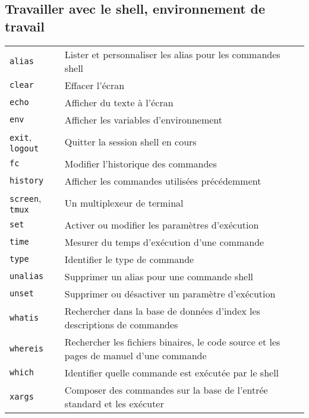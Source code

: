 \documentclass[10pt,a4paper]{article}
\begin{document}
\begin{multicols}{2}
\section{Travailler avec le shell, environnement de travail}
\begin{tabular}{ p{2.5cm} p{8.5cm} }
  \hline
  \texttt{alias} & Lister et personnaliser les alias pour les commandes shell \\
  \rowcolor{Gray}
  \texttt{clear} & Effacer l'écran \\
  \texttt{echo} & Afficher du texte à l'écran \\
  \rowcolor{Gray}
  \texttt{env} & Afficher les variables d'environnement \\
  \texttt{exit}, \texttt{logout} & Quitter la session shell en cours \\
  \rowcolor{Gray}
  \texttt{fc} & Modifier l'historique des commandes \\
  \texttt{history} & Afficher les commandes utilisées précédemment \\
  \rowcolor{Gray}
  \texttt{screen}, \texttt{tmux} & Un multiplexeur de terminal \\
  \texttt{set} & Activer ou modifier les paramètres d'exécution \\
  \rowcolor{Gray}
  \texttt{time} & Mesurer du temps d'exécution d'une commande \\
  \texttt{type} & Identifier le type de commande \\
  \rowcolor{Gray}
  \texttt{unalias} & Supprimer un alias pour une commande shell \\
  \texttt{unset} & Supprimer ou désactiver un paramètre d'exécution \\
  \rowcolor{Gray}
  \texttt{whatis} & Rechercher dans la base de données d'index les descriptions de commandes \\
  \texttt{whereis} & Rechercher les fichiers binaires, le code source et les pages de manuel d'une commande \\
  \rowcolor{Gray}
  \texttt{which} & Identifier quelle commande est exécutée par le shell\\
  \texttt{xargs} & Composer des commandes sur la base de l'entrée standard et les exécuter\\
  \hline
\end{tabular}



\end{multicols}
\end{document}
